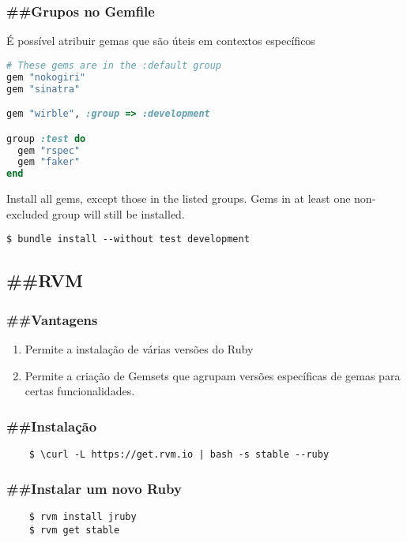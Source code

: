 \documentclass[serif,mathserif]{article}
\begin{document}
\subsubsection{\#\#Grupos no Gemfile}
É possível atribuir gemas que são úteis em contextos específicos
\begin{lstlisting}[language=ruby]
# These gems are in the :default group
gem "nokogiri"
gem "sinatra"

gem "wirble", :group => :development

group :test do
  gem "rspec"
  gem "faker"
end
\end{lstlisting}
  
Install all gems, except those in the listed groups. Gems in at least one non-excluded group will still be installed.
\begin{verbatim}
$ bundle install --without test development
\end{verbatim}

\subsection{\#\#RVM}

\subsubsection{\#\#Vantagens}

\begin{enumerate}
  \item Permite a instalação de várias versões do Ruby
  \item Permite a criação de Gemsets que agrupam versões específicas de gemas para certas funcionalidades.
\end{enumerate}


\subsubsection{\#\#Instalação}

\begin{verbatim}
    $ \curl -L https://get.rvm.io | bash -s stable --ruby
\end{verbatim}

\subsubsection{\#\#Instalar um novo Ruby}

\begin{verbatim}
    $ rvm install jruby
    $ rvm get stable
\end{verbatim}
\end{document}
